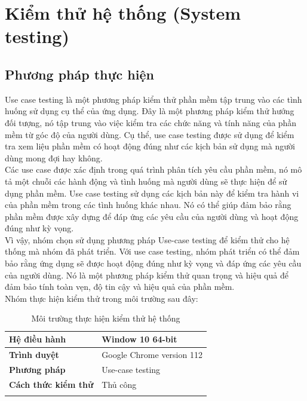 \newpage
\section{Kiểm thử hệ thống (System testing)}
\subsection{Phương pháp thực hiện}

Use case testing là một phương pháp kiểm thử phần mềm tập trung vào các tình huống sử dụng cụ thể của ứng dụng. Đây là một phương pháp kiểm thử hướng đối tượng, nó tập trung vào việc kiểm tra các chức năng và tính năng của phần mềm từ góc độ của người dùng. Cụ thể, use case testing được sử dụng để kiểm tra xem liệu phần mềm có hoạt động đúng như các kịch bản sử dụng mà người dùng mong đợi hay không.\\

Các use case được xác định trong quá trình phân tích yêu cầu phần mềm, nó mô tả một chuỗi các hành động và tình huống mà người dùng sẽ thực hiện để sử dụng phần mềm. Use case testing sử dụng các kịch bản này để kiểm tra hành vi của phần mềm trong các tình huống khác nhau. Nó có thể giúp đảm bảo rằng phần mềm được xây dựng để đáp ứng các yêu cầu của người dùng và hoạt động đúng như kỳ vọng.\\

Vì vậy, nhóm chọn sử dụng phương pháp Use-case testing để kiểm thử cho hệ thống mà nhóm đã phát triển. Với use case testing, nhóm phát triển có thể đảm bảo rằng ứng dụng sẽ được hoạt động đúng như kỳ vọng và đáp ứng các yêu cầu của người dùng. Nó là một phương pháp kiểm thử quan trọng và hiệu quả để đảm bảo tính toàn vẹn, độ tin cậy và hiệu quả của phần mềm.\\

\hspace*{0.5cm}Nhóm thực hiện kiểm thử trong môi trường sau đây:
\\
{
\setlength\extrarowheight{6pt}
\begin{longtable}{| p{} | p{} |}
    \hline
    \textbf{Hệ điều hành}       & Window 10 64-bit          \\
    \hline
    \textbf{Trình duyệt}        & Google Chrome version 112 \\
    \hline
    \textbf{Phương pháp}        & Use-case testing          \\
    \hline
    \textbf{Cách thức kiểm thử} & Thủ công                  \\
    \hline
    \caption{Môi trường thực hiện kiểm thử hệ thống}
\end{longtable}
}

